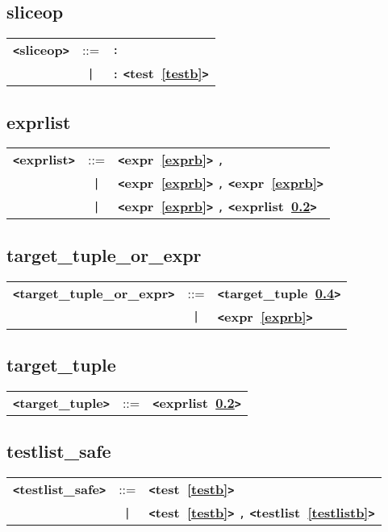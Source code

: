 \documentclass[12pt]{article}
\begin{document}
\subsection{sliceop}
\label{sliceopb}
\begin{tabular}{lcl}
{\bf \verb+<+sliceop\verb+>+} & ::=  & \verb|:| \\
 & \verb+|+  & \verb|:| {\bf \verb+<+test~\ref{testb}\verb+>+}  \\
\end{tabular}

\subsection{exprlist}
\label{exprlistb}
\begin{tabular}{lcl}
{\bf \verb+<+exprlist\verb+>+} & ::=  & {\bf \verb+<+expr~\ref{exprb}\verb+>+}  \verb|,| \\
 & \verb+|+  & {\bf \verb+<+expr~\ref{exprb}\verb+>+}  \verb|,| {\bf \verb+<+expr~\ref{exprb}\verb+>+}  \\
 & \verb+|+  & {\bf \verb+<+expr~\ref{exprb}\verb+>+}  \verb|,| {\bf \verb+<+exprlist~\ref{exprlistb}\verb+>+}  \\
\end{tabular}

\subsection{target\_tuple\_or\_expr}
\label{targetzzztuplezzzorzzzexprb}
\begin{tabular}{lcl}
{\bf \verb+<+target\_tuple\_or\_expr\verb+>+} & ::=  & {\bf \verb+<+target\_tuple~\ref{targetzzztupleb}\verb+>+}  \\
 & \verb+|+  & {\bf \verb+<+expr~\ref{exprb}\verb+>+}  \\
\end{tabular}

\subsection{target\_tuple}
\label{targetzzztupleb}
\begin{tabular}{lcl}
{\bf \verb+<+target\_tuple\verb+>+} & ::=  & {\bf \verb+<+exprlist~\ref{exprlistb}\verb+>+}  \\
\end{tabular}

\subsection{testlist\_safe}
\label{testlistzzzsafeb}
\begin{tabular}{lcl}
{\bf \verb+<+testlist\_safe\verb+>+} & ::=  & {\bf \verb+<+test~\ref{testb}\verb+>+}  \\
 & \verb+|+  & {\bf \verb+<+test~\ref{testb}\verb+>+}  \verb|,| {\bf \verb+<+testlist~\ref{testlistb}\verb+>+}  \\
\end{tabular} \\
\end{document}
